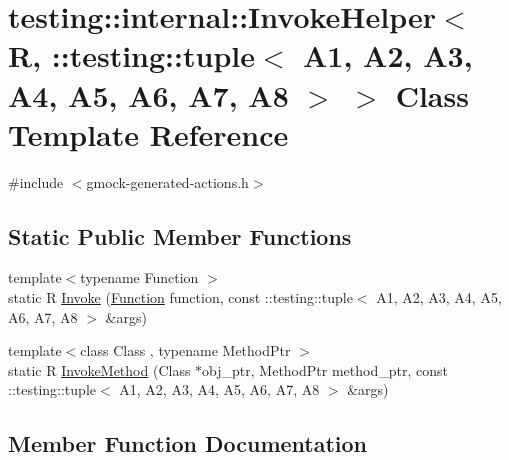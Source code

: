 \hypertarget{classtesting_1_1internal_1_1InvokeHelper_3_01R_00_01_1_1testing_1_1tuple_3_01A1_00_01A2_00_01A3_3417e5c524ad74e18b0b4b31a005e438}{}\section{testing\+::internal\+::Invoke\+Helper$<$ R, \+::testing\+::tuple$<$ A1, A2, A3, A4, A5, A6, A7, A8 $>$ $>$ Class Template Reference}
\label{classtesting_1_1internal_1_1InvokeHelper_3_01R_00_01_1_1testing_1_1tuple_3_01A1_00_01A2_00_01A3_3417e5c524ad74e18b0b4b31a005e438}


{\ttfamily \#include $<$gmock-\/generated-\/actions.\+h$>$}

\subsection*{Static Public Member Functions}
\begin{DoxyCompactItemize}
\item 
{\footnotesize template$<$typename Function $>$ }\\static R \mbox{\hyperlink{classtesting_1_1internal_1_1InvokeHelper_3_01R_00_01_1_1testing_1_1tuple_3_01A1_00_01A2_00_01A3_3417e5c524ad74e18b0b4b31a005e438_af95ae18df031176f81009667d1cf75eb}{Invoke}} (\mbox{\hyperlink{structtesting_1_1internal_1_1Function}{Function}} function, const \+::testing\+::tuple$<$ A1, A2, A3, A4, A5, A6, A7, A8 $>$ \&args)
\item 
{\footnotesize template$<$class Class , typename Method\+Ptr $>$ }\\static R \mbox{\hyperlink{classtesting_1_1internal_1_1InvokeHelper_3_01R_00_01_1_1testing_1_1tuple_3_01A1_00_01A2_00_01A3_3417e5c524ad74e18b0b4b31a005e438_ae6d436cea8db7cfa36330728d3e5da9a}{Invoke\+Method}} (Class $\ast$obj\+\_\+ptr, Method\+Ptr method\+\_\+ptr, const \+::testing\+::tuple$<$ A1, A2, A3, A4, A5, A6, A7, A8 $>$ \&args)
\end{DoxyCompactItemize}


\subsection{Member Function Documentation}
\mbox{\label{classtesting_1_1internal_1_1InvokeHelper_3_01R_00_01_1_1testing_1_1tuple_3_01A1_00_01A2_00_01A3_3417e5c524ad74e18b0b4b31a005e438_af95ae18df031176f81009667d1cf75eb}} 
